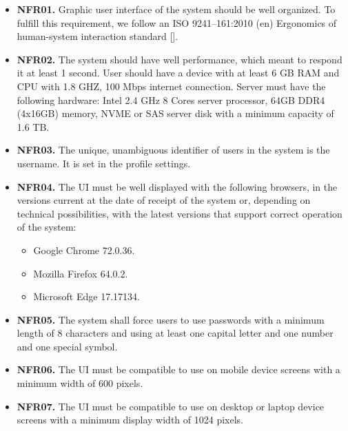 \begin{itemize}
    \item \textbf{NFR01.} Graphic user interface of the system should be well organized.
    To fulfill this requirement, we follow an ISO 9241--161:2010 (en) Ergonomics of human-system interaction
    standard [\cite{iso2010ergonomics}].
    \item \textbf{NFR02.} The system should have well performance, which meant to respond it at least 1 second.
    User should have a device with at least 6 GB RAM and CPU with 1.8 GHZ, 100 Mbps internet connection.
    Server must have the following hardware: Intel 2.4 GHz 8 Cores server processor, 64GB DDR4 (4x16GB) memory, NVME or SAS
    server disk with a minimum capacity of 1.6 TB\@.
    \item \textbf{NFR03.} The unique, unambiguous identifier of users in the system is the username.
    It is set in the profile settings.
    \item \textbf{NFR04.} The UI must be well displayed with the following browsers, in the versions
    current at the date of receipt of the system or, depending on technical possibilities,
    with the latest versions that support correct operation of the system:
    \begin{itemize}
        \item Google Chrome 72.0.36.
        \item Mozilla Firefox 64.0.2.
        \item Microsoft Edge 17.17134.
    \end{itemize}
    \item \textbf{NFR05.} The system shall force users to use passwords with a minimum length of 8
    characters and using at least one capital letter and one number and one special symbol.
    \item \textbf{NFR06.} The UI must be compatible to use on mobile device screens with a minimum
    width of 600 pixels.
    \item \textbf{NFR07.} The UI must be compatible to use on desktop or laptop device screens with a
    minimum display width of 1024 pixels.
\end{itemize}